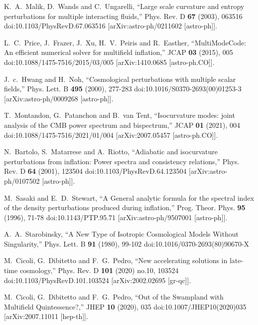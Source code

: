 \documentclass[a4paper,11pt]{article}
\begin{document}
\begin{thebibliography}{10}
K.~A.~Malik, D.~Wands and C.~Ungarelli,
``Large scale curvature and entropy perturbations for multiple interacting fluids,''
Phys. Rev. D \textbf{67} (2003), 063516
doi:10.1103/PhysRevD.67.063516
[arXiv:astro-ph/0211602 [astro-ph]].

L.~C.~Price, J.~Frazer, J.~Xu, H.~V.~Peiris and R.~Easther,
``MultiModeCode: An efficient numerical solver for multifield inflation,''
JCAP \textbf{03} (2015), 005
doi:10.1088/1475-7516/2015/03/005
[arXiv:1410.0685 [astro-ph.CO]].

J.~c.~Hwang and H.~Noh,
``Cosmological perturbations with multiple scalar fields,''
Phys. Lett. B \textbf{495} (2000), 277-283
doi:10.1016/S0370-2693(00)01253-3
[arXiv:astro-ph/0009268 [astro-ph]].

T.~Montandon, G.~Patanchon and B.~van Tent,
``Isocurvature modes: joint analysis of the CMB power spectrum and bispectrum,''
JCAP \textbf{01} (2021), 004
doi:10.1088/1475-7516/2021/01/004
[arXiv:2007.05457 [astro-ph.CO]].

N.~Bartolo, S.~Matarrese and A.~Riotto,
``Adiabatic and isocurvature perturbations from inflation: Power spectra and consistency relations,''
Phys. Rev. D \textbf{64} (2001), 123504
doi:10.1103/PhysRevD.64.123504
[arXiv:astro-ph/0107502 [astro-ph]].

M.~Sasaki and E.~D.~Stewart,
``A General analytic formula for the spectral index of the density perturbations produced during inflation,''
Prog. Theor. Phys. \textbf{95} (1996), 71-78
doi:10.1143/PTP.95.71
[arXiv:astro-ph/9507001 [astro-ph]].

A.~A.~Starobinsky,
``A New Type of Isotropic Cosmological Models Without Singularity,''
Phys. Lett. B \textbf{91} (1980), 99-102
doi:10.1016/0370-2693(80)90670-X

M.~Cicoli, G.~Dibitetto and F.~G.~Pedro,
``New accelerating solutions in late-time cosmology,''
Phys. Rev. D \textbf{101} (2020) no.10, 103524
doi:10.1103/PhysRevD.101.103524
[arXiv:2002.02695 [gr-qc]].

M.~Cicoli, G.~Dibitetto and F.~G.~Pedro,
``Out of the Swampland with Multifield Quintessence?,''
JHEP \textbf{10} (2020), 035
doi:10.1007/JHEP10(2020)035
[arXiv:2007.11011 [hep-th]].
  
\end{thebibliography}

 
\end{document}
